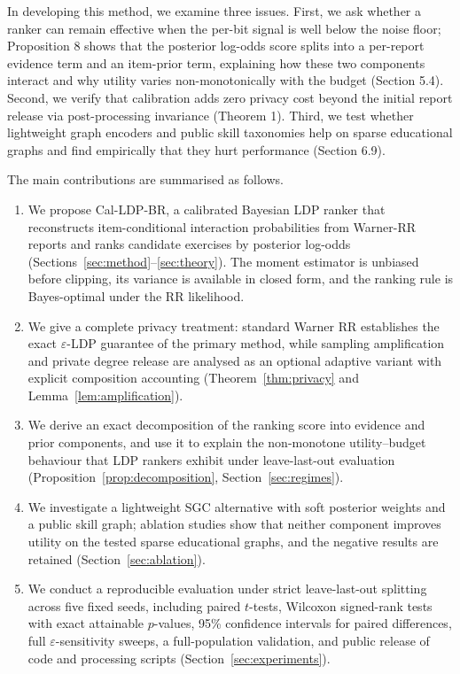 \documentclass[pdflatex,sn-basic,Numbered]{sn-jnl}
\theoremstyle{plain}
\theoremstyle{remark}
\theoremstyle{definition}
\newcommand{\eps}{\varepsilon}
\begin{document}
In developing this method, we examine three issues. First, we ask whether a ranker can remain effective when the per-bit signal is well below the noise floor; Proposition 8 shows that the posterior log-odds score splits into a per-report evidence term and an item-prior term, explaining how these two components interact and why utility varies non-monotonically with the budget (Section 5.4). Second, we verify that calibration adds zero privacy cost beyond the initial report release via post-processing invariance (Theorem 1). Third, we test whether lightweight graph encoders and public skill taxonomies help on sparse educational graphs and find empirically that they hurt performance (Section 6.9).

The main contributions are summarised as follows.
\begin{enumerate}
\item We propose Cal-LDP-BR, a calibrated Bayesian LDP ranker that reconstructs item-conditional interaction probabilities from Warner-RR reports and ranks candidate exercises by posterior log-odds (Sections~\ref{sec:method}--\ref{sec:theory}). The moment estimator is unbiased before clipping, its variance is available in closed form, and the ranking rule is Bayes-optimal under the RR likelihood.
\item We give a complete privacy treatment: standard Warner RR establishes the exact $\eps$-LDP guarantee of the primary method, while sampling amplification and private degree release are analysed as an optional adaptive variant with explicit composition accounting (Theorem~\ref{thm:privacy} and Lemma~\ref{lem:amplification}).
\item We derive an exact decomposition of the ranking score into evidence and prior components, and use it to explain the non-monotone utility--budget behaviour that LDP rankers exhibit under leave-last-out evaluation (Proposition~\ref{prop:decomposition}, Section~\ref{sec:regimes}).
\item We investigate a lightweight SGC alternative with soft posterior weights and a public skill graph; ablation studies show that neither component improves utility on the tested sparse educational graphs, and the negative results are retained (Section~\ref{sec:ablation}).
\item We conduct a reproducible evaluation under strict leave-last-out splitting across five fixed seeds, including paired $t$-tests, Wilcoxon signed-rank tests with exact attainable $p$-values, 95\% confidence intervals for paired differences, full $\eps$-sensitivity sweeps, a full-population validation, and public release of code and processing scripts (Section~\ref{sec:experiments}).
\end{enumerate}
\end{document}
